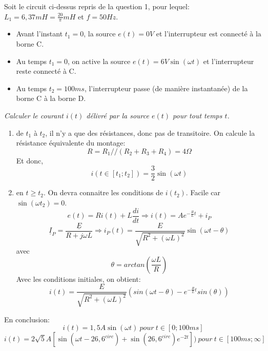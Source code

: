 Soit le circuit ci-dessus repris de la question 1, pour lequel: $L_1=6,37mH=\frac{20}{\pi}mH$ et  $f=50Hz$.
\begin{itemize}
	\item Avant l'instant $t_1=0$, la source $e(t)=0V$ et l'interrupteur est connecté à la borne C.
	\item Au temps $t_1=0$, on active la source $e(t)=6V \sin(\omega t)$ et l'interrupteur reste connecté à C.
	\item Au temps $t_2=100ms$, l'interrupteur passe (de manière instantanée) de la borne C à la borne D.
\end{itemize}
\vspace{3mm}

\Question
{
\textit{Calculer le courant $i(t)$ délivré par la source $e(t)$ pour tout temps $t$.}
}
{%
\begin{enumerate}
\item de $t_1$ à $t_2$, il n'y a que des résistances, donc pas de transitoire. On calcule la résistance équivalente du montage:
$$R=R_1//(R_2+R_3+R_4)=4\Omega$$
Et donc,
$$i(t\in[t_1;t_2])=\frac{3}{2}\sin(\omega t)$$
\item en $t\geq t_2$. On devra connaitre les conditions de $i(t_2)$. Facile car $\sin(\omega t_2)=0$.
$$e(t)=Ri(t)+L\frac{di}{dt} \Rightarrow i(t) = Ae^{-\frac{R}{L}t}+i_P$$
$$\underline{I}_P=\frac{\underline{E}}{R+j\omega L}\Rightarrow i_P(t)=\frac{E}{\sqrt{R^2+(\omega L)^2}} \sin(\omega t - \theta)$$
avec $$\theta=arctan(\frac{\omega L}{R})$$
Avec les conditions initiales, on obtient:
$$i(t) = \frac{E}{\sqrt{R^2+(\omega L)^2}}(sin(\omega t-\theta)-e^{-\frac{R}{L}t}sin(\theta))$$
\end{enumerate}

En conclusion:
$$i(t)=1,5A\sin(\omega t)\ pour\ t\in[0;100ms]$$
$$i(t)=2\sqrt{5}A[\sin(\omega t-26,6^{circ})+\sin(26,6^{circ})e^{-2t}])\ pour\ t\in[100ms;\infty]$$
}

